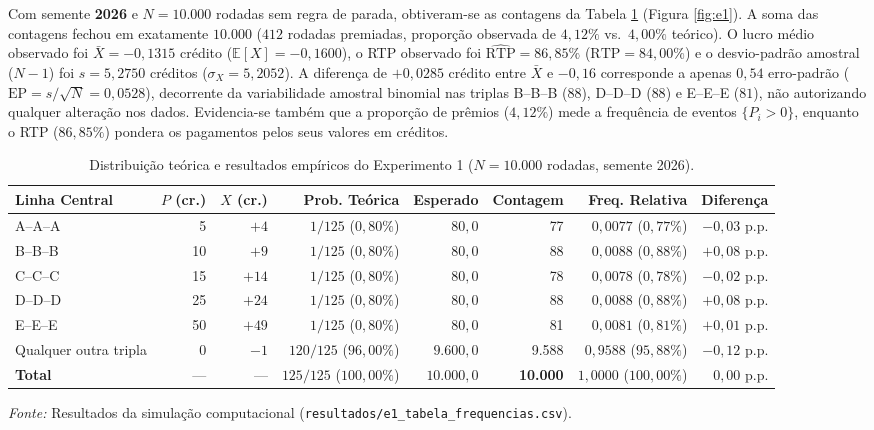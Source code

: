 \documentclass[10pt,a4paper]{article}
\begin{document}
Com semente \textbf{2026} e $N = 10.000$ rodadas sem regra de parada, obtiveram-se as contagens da Tabela \ref{tab:e1} (Figura \ref{fig:e1}). A soma das contagens fechou em exatamente $10.000$ ($412$ rodadas premiadas, proporção observada de $4{,}12\%$ vs.\ $4{,}00\%$ teórico). O lucro médio observado foi $\bar{X} = -0{,}1315$ crédito ($\mathbb{E}[X] = -0{,}1600$), o RTP observado foi $\widehat{\text{RTP}} = 86{,}85\%$ ($\text{RTP} = 84{,}00\%$) e o desvio-padrão amostral ($N-1$) foi $s = 5{,}2750$ créditos ($\sigma_X = 5{,}2052$). A diferença de $+0{,}0285$ crédito entre $\bar{X}$ e $-0{,}16$ corresponde a apenas $0{,}54$ erro-padrão ($\text{EP} = s/\sqrt{N} = 0{,}0528$), decorrente da variabilidade amostral binomial nas triplas B--B--B ($88$), D--D--D ($88$) e E--E--E ($81$), não autorizando qualquer alteração nos dados. Evidencia-se também que a proporção de prêmios ($4{,}12\%$) mede a frequência de eventos $\{P_i > 0\}$, enquanto o RTP ($86{,}85\%$) pondera os pagamentos pelos seus valores em créditos.

\begin{table}[H]
\centering
\caption{Distribuição teórica e resultados empíricos do Experimento 1 ($N = 10.000$ rodadas, semente 2026).}
\label{tab:e1}
\footnotesize
\begin{tabular}{lrrrrrrr}
\toprule
\textbf{Linha Central} & \textbf{$P$ (cr.)} & \textbf{$X$ (cr.)} & \textbf{Prob. Teórica} & \textbf{Esperado} & \textbf{Contagem} & \textbf{Freq. Relativa} & \textbf{Diferença} \\
\midrule
A--A--A & 5 & $+4$ & $1/125$ ($0{,}80\%$) & $80{,}0$ & 77 & $0{,}0077$ ($0{,}77\%$) & $-0{,}03$ p.p. \\
B--B--B & 10 & $+9$ & $1/125$ ($0{,}80\%$) & $80{,}0$ & 88 & $0{,}0088$ ($0{,}88\%$) & $+0{,}08$ p.p. \\
C--C--C & 15 & $+14$ & $1/125$ ($0{,}80\%$) & $80{,}0$ & 78 & $0{,}0078$ ($0{,}78\%$) & $-0{,}02$ p.p. \\
D--D--D & 25 & $+24$ & $1/125$ ($0{,}80\%$) & $80{,}0$ & 88 & $0{,}0088$ ($0{,}88\%$) & $+0{,}08$ p.p. \\
E--E--E & 50 & $+49$ & $1/125$ ($0{,}80\%$) & $80{,}0$ & 81 & $0{,}0081$ ($0{,}81\%$) & $+0{,}01$ p.p. \\
Qualquer outra tripla & 0 & $-1$ & $120/125$ ($96{,}00\%$) & $9.600{,}0$ & 9.588 & $0{,}9588$ ($95{,}88\%$) & $-0{,}12$ p.p. \\
\midrule
\textbf{Total} & --- & --- & $125/125$ ($100{,}00\%$) & $10.000{,}0$ & \textbf{10.000} & $1{,}0000$ ($100{,}00\%$) & $0{,}00$ p.p. \\
\bottomrule
\end{tabular}
\begin{flushleft}
\scriptsize \textit{Fonte:} Resultados da simulação computacional (\texttt{resultados/e1\_tabela\_frequencias.csv}).
\end{flushleft}
\end{table}
\end{document}
